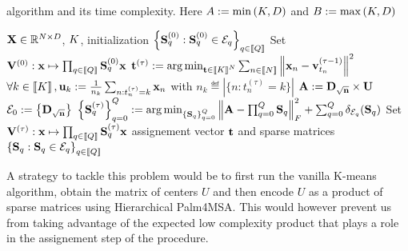 \begin{algorithm*}[t]
	\caption{\qkmeans algorithm and its time complexity. Here $A := \min\left (K, D\right )$ and $B := \max\left (K, D\right )$}
	\label{algo:qmeans}
	\begin{algorithmic}[1]
\REQUIRE ${\mathbf{X}} \in \mathbb{R}^{N \times D}$, $K$, initialization $\left \lbrace {\mathbf{S}}_q^{(0)} : {\mathbf{S}}_q^{(0)} \in \mathcal{E}_q\right \rbrace_{q\in\left \llbracket Q\right \rrbracket}$
\STATE Set ${\mathbf{V}}^{(0)} : {\mathbf{x}} \mapsto \prod_{q\in\left \llbracket Q\right \rrbracket}{{\mathbf{S}}_q^{(0)}} {\mathbf{x}}$
	\STATE ${\mathbf{t}}^{(\tau)} := \operatorname*{arg\,min}_{{\mathbf{t}} \in \left \llbracket K\right \rrbracket^N} \sum_{n\in\left \llbracket N\right \rrbracket} {\left \|{\mathbf{x}}_n - {\mathbf{v}}^{(\tau -1)}_{t_n}\right \|^2}$
	\label{line:qmeans:assignment}
	\STATE $\forall k\in\left \llbracket K\right \rrbracket, {\mathbf{u}}_k := \frac{1}{n_k} \sum_{n: t_n^{(\tau)}= k} {{\mathbf{x}}_n}$
with $n_k \eqdef |\{n: t_n^{(\tau)}=k\}|$
	\COMMENT{$\bigO{\nexamples\datadim}$}
	\label{line:qmeans:compute_means}
	\STATE ${\mathbf{A}} := {\mathbf{D}}_{\sqrt{{\mathbf{n}}}} \times {\mathbf{U}} $
	\COMMENT{$\bigO{\nclusters\datadim}$}
	\label{line:qmeans:A}
	\STATE $\mathcal{E}_0 := \left \lbrace {\mathbf{D}}_{\sqrt{{\mathbf{n}}}} \right \rbrace$
	\label{line:qmeans:E0}
	\STATE $\left \lbrace {\mathbf{S}}_q^{(\tau)}\right \rbrace_{q=0}^Q := \operatorname*{arg\,min}_{\left \lbrace {\mathbf{S}}_q\right \rbrace_{q=0}^Q} \left \|{\mathbf{A}} - \prod_{q=0}^Q{\mathbf{S}}_q\right \|_F^2 + \sum_{q=0}^Q \delta_{\mathcal{E}_q}({\mathbf{S}}_q)$
	\label{line:qmeans:S}
	\STATE Set ${\mathbf{V}}^{(\tau)} : {\mathbf{x}} \mapsto \prod_{q\in\left \llbracket Q\right \rrbracket}{{\mathbf{S}}_q^{(\tau)}} {\mathbf{x}}$
	\label{line:qmeans:U}
	\ENDFOR
	\ENSURE assignement vector ${\mathbf{t}}$ and sparse matrices $\left \lbrace {\mathbf{S}}_q : {\mathbf{S}}_q \in \mathcal{E}_q\right \rbrace_{q\in\left \llbracket Q\right \rrbracket}$ %
\end{algorithmic}
\end{algorithm*}

\iffalse
\begin{remark}
A strategy to tackle this problem would be to first run the vanilla K-means algorithm,
 obtain the matrix of centers $U$ and then encode $U$ as a product of sparse matrices
 using Hierarchical Palm4MSA. This would however prevent us from taking advantage of 
 the expected low complexity product that plays a role in the assignement step of 
 the procedure.
\end{remark}

